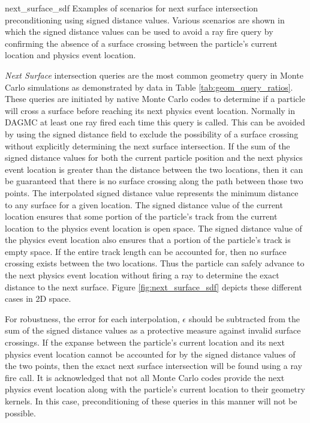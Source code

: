              {next_surface_sdf}
             {Examples of scenarios for next surface intersection
               preconditioning using signed distance values. Various scenarios
               are shown in which the signed distance values can be used to
               avoid a ray fire query by confirming the absence of a surface
               crossing between the particle's current location and physics
               event location. } {
               \textit{Next Surface} intersection queries are the most common
               geometry query in Monte Carlo simulations as demonstrated by data
               in Table \ref{tab:geom_query_ratios}. These queries are initiated by
               native Monte Carlo codes to determine if a particle will cross a
               surface before reaching its next physics event location. Normally
               in DAGMC at least one ray fired each time this query is called. This can
               be avoided by using the signed distance field to exclude the
               possibility of a surface crossing without explicitly determining
               the next surface intersection. If the sum of the signed distance
               values for both the current particle position and the next
               physics event location is greater than the distance between the
               two locations, then it can be guaranteed that there is no surface
               crossing along the path between those two points. The
               interpolated signed distance value represents the minimum
               distance to any surface for a given location. The signed distance
               value of the current location ensures that some portion of the
               particle's track from the current location to the physics event
               location is open space. The signed distance value of the physics
               event location also ensures that a portion of the particle's
               track is empty space. If the entire track length can be accounted
               for, then no surface crossing exists between the two
               locations. Thus the particle can safely advance to the next
               physics event location without firing a ray to determine the
               exact distance to the next surface. Figure
               \ref{fig:next_surface_sdf} depicts these different cases in 2D
               space.
               
               For robustness, the error for each interpolation, $\epsilon$
               should be subtracted from the sum of the signed distance values
               as a protective measure against invalid surface crossings. If the
               expanse between the particle's current location and its next
               physics event location cannot be accounted for by the signed
               distance values of the two points, then the exact next surface
               intersection will be found using a ray fire call. It is
               acknowledged that not all Monte Carlo codes provide the next
               physics event location along with the particle's current location
               to their geometry kernels. In this case, preconditioning of these
               queries in this manner will not be possible.
              }

